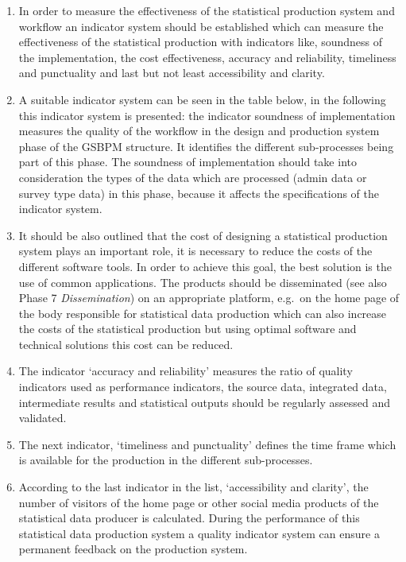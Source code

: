 \documentclass[
]{article}
\begin{document}
\begin{enumerate}
\def\labelenumi{\arabic{enumi}.}
\setcounter{enumi}{285}
\item
  In order to measure the effectiveness of the statistical production
  system and workflow an indicator system should be established which
  can measure the effectiveness of the statistical production with
  indicators like, soundness of the implementation, the cost
  effectiveness, accuracy and reliability, timeliness and punctuality
  and last but not least accessibility and clarity.
\item
  A suitable indicator system can be seen in the table below, in the
  following this indicator system is presented: the indicator
  soundness of implementation measures the quality of the workflow in
  the design and production system phase of the GSBPM structure. It
  identifies the different sub-processes being part of this phase. The
  soundness of implementation should take into consideration the types
  of the data which are processed (admin data or survey type data) in
  this phase, because it affects the specifications of the indicator
  system.
\item
  It should be also outlined that the cost of designing a statistical
  production system plays an important role, it is necessary to reduce
  the costs of the different software tools. In order to achieve this
  goal, the best solution is the use of common applications. The
  products should be disseminated (see also Phase 7 \emph{Dissemination})
  on an appropriate platform, e.g.~on the home page of the body
  responsible for statistical data production which can also increase
  the costs of the statistical production but using optimal software
  and technical solutions this cost can be reduced.
\item
  The indicator `accuracy and reliability' measures the ratio of
  quality indicators used as performance indicators, the source data,
  integrated data, intermediate results and statistical outputs should
  be regularly assessed and validated.
\item
  The next indicator, `timeliness and punctuality' defines the time
  frame which is available for the production in the different
  sub-processes.
\item
  According to the last indicator in the list, `accessibility and
  clarity', the number of visitors of the home page or other social
  media products of the statistical data producer is calculated.
  During the performance of this statistical data production system a
  quality indicator system can ensure a permanent feedback on the
  production system.
\end{enumerate}
\end{document}
